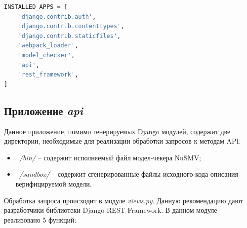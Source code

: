 \begin{lstlisting}[language=Python, 
label=lst:config, 
caption={Фрагмент конфигурационного файла Django.}]
INSTALLED_APPS = [
	'django.contrib.auth',
	'django.contrib.contenttypes',
	'django.contrib.staticfiles',
	'webpack_loader',
	'model_checker',
	'api',
	'rest_framework',
]
\end{lstlisting}

\subsection{Приложение \textit{api}}

Данное приложение, помимо генерируемых Django модулей, содержит две директории, необходимые для реализации обработки запросов к методам API:

\begin{itemize}
	\item \textit{~/bin/} -- содержит исполняемый файл модел-чекера NuSMV;
	\item \textit{~/sandbox/} -- содержит сгенерированные файлы исходного кода описания верифицируемой модели.
\end{itemize}

Обработка запроса происходит в модуле \textit{views.py}. Данную рекомендацию дают разработчики библиотеки Django REST Framework. В данном модуле реализовано 5 функций:

